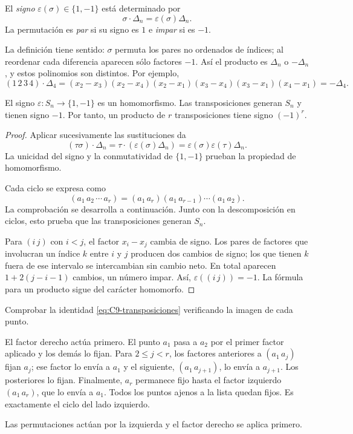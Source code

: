 \begin{defi}
El \emph{signo} $\varepsilon(\sigma)\in\{1,-1\}$ está determinado por
\[
\sigma\cdot\Delta_n=\varepsilon(\sigma)\Delta_n.
\]
La permutación es \emph{par} si su signo es $1$ e \emph{impar} si es $-1$.
\end{defi}
La definición tiene sentido: $\sigma$ permuta los pares no ordenados de índices; al reordenar cada diferencia aparecen sólo factores $-1$. Así el producto es $\Delta_n$ o $-\Delta_n$, y estos polinomios son distintos. Por ejemplo,
\[
(1\,2\,3\,4)\cdot\Delta_4
=(x_2-x_3)(x_2-x_4)(x_2-x_1)(x_3-x_4)(x_3-x_1)(x_4-x_1)
=-\Delta_4.
\]
\begin{prop}\label{prop:C9-signo}
El signo $\varepsilon:S_n\to\{1,-1\}$ es un homomorfismo. Las transposiciones generan $S_n$ y tienen signo $-1$. Por tanto, un producto de $r$ transposiciones tiene signo $(-1)^r$.
\end{prop}
\begin{proof}
Aplicar sucesivamente las sustituciones da
\[
(\tau\sigma)\cdot\Delta_n
=\tau\cdot(\varepsilon(\sigma)\Delta_n)
=\varepsilon(\sigma)\varepsilon(\tau)\Delta_n.
\]
La unicidad del signo y la conmutatividad de $\{1,-1\}$ prueban la propiedad de homomorfismo.

Cada ciclo se expresa como
\begin{equation}\label{eq:C9-transposiciones}
(a_1\,a_2\,\cdots\,a_r)
=(a_1\,a_r)(a_1\,a_{r-1})\cdots(a_1\,a_2).
\end{equation}
La comprobación se desarrolla a continuación. Junto con la descomposición en ciclos, esto prueba que las transposiciones generan $S_n$.

Para $(i\,j)$ con $i<j$, el factor $x_i-x_j$ cambia de signo. Los pares de factores que involucran un índice $k$ entre $i$ y $j$ producen dos cambios de signo; los que tienen $k$ fuera de ese intervalo se intercambian sin cambio neto. En total aparecen $1+2(j-i-1)$ cambios, un número impar. Así, $\varepsilon((i\,j))=-1$. La fórmula para un producto sigue del carácter homomorfo.
\end{proof}
\begin{ejer}
Comprobar la identidad \eqref{eq:C9-transposiciones} verificando la imagen de cada punto.
\end{ejer}
\begin{sol}
El factor derecho actúa primero. El punto $a_1$ pasa a $a_2$ por el primer factor aplicado y los demás lo fijan. Para $2\le j<r$, los factores anteriores a $(a_1\,a_j)$ fijan $a_j$; ese factor lo envía a $a_1$ y el siguiente, $(a_1\,a_{j+1})$, lo envía a $a_{j+1}$. Los posteriores lo fijan. Finalmente, $a_r$ permanece fijo hasta el factor izquierdo $(a_1\,a_r)$, que lo envía a $a_1$. Todos los puntos ajenos a la lista quedan fijos. Es exactamente el ciclo del lado izquierdo.
\end{sol}
\begin{obs}
Las permutaciones actúan por la izquierda y el factor derecho se aplica primero.
\end{obs}

